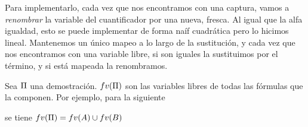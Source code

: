 Para implementarlo, cada vez que nos encontramos con una captura, vamos a \textit{renombrar} la variable del cuantificador por una nueva, fresca. Al igual que la alfa igualdad, esto se puede implementar de forma naíf cuadrática pero lo hicimos lineal. Mantenemos un único mapeo a lo largo de la sustitución, y cada vez que nos encontramos con una variable libre, si son iguales la sustituimos por el término, y si está mapeada la renombramos.

\begin{definition} Sea $\Pi$ una demostración. $fv(\Pi)$ son las variables libres de todas las fórmulas que la componen. Por ejemplo, para la siguiente

    \proofTreeAndI

    se tiene $fv(\Pi) = fv(A) \cup fv(B)$
    
\end{definition}
